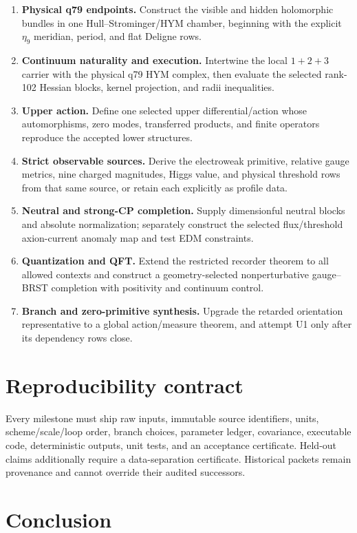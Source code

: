 \documentclass[11pt]{article}
\begin{document}
\begin{enumerate}
\item \textbf{Physical q79 endpoints.} Construct the visible and hidden
holomorphic bundles in one Hull--Strominger/HYM chamber, beginning with the
explicit $\eta_9$ meridian, period, and flat Deligne rows.
\item \textbf{Continuum naturality and execution.} Intertwine the local
$1+2+3$ carrier with the physical q79 HYM complex, then evaluate the selected
rank-102 Hessian blocks, kernel projection, and radii inequalities.
\item \textbf{Upper action.} Define one selected upper differential/action
whose automorphisms, zero modes, transferred products, and finite operators
reproduce the accepted lower structures.
\item \textbf{Strict observable sources.} Derive the electroweak primitive,
relative gauge metrics, nine charged magnitudes, Higgs value, and physical
threshold rows from that same source, or retain each explicitly as profile
data.
\item \textbf{Neutral and strong-CP completion.} Supply dimensionful neutral
blocks and absolute normalization; separately construct the selected
flux/threshold axion-current anomaly map and test EDM constraints.
\item \textbf{Quantization and QFT.} Extend the restricted recorder theorem to
all allowed contexts and construct a geometry-selected nonperturbative
gauge--BRST completion with positivity and continuum control.
\item \textbf{Branch and zero-primitive synthesis.} Upgrade the retarded
orientation representative to a global action/measure theorem, and attempt U1
only after its dependency rows close.
\end{enumerate}

\section{Reproducibility contract}

Every milestone must ship raw inputs, immutable source identifiers, units,
scheme/scale/loop order, branch choices, parameter ledger, covariance,
executable code, deterministic outputs, unit tests, and an acceptance
certificate. Held-out claims additionally require a data-separation
certificate. Historical packets remain provenance and cannot override their
audited successors.

\section{Conclusion}
\end{document}
